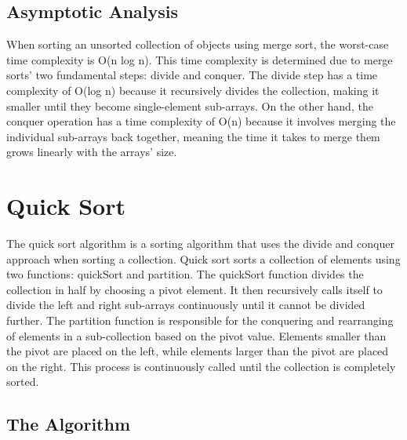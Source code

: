\documentclass[letterpaper, 10pt,DIV=13]{scrartcl}
\numberwithin{equation}{section} %
\numberwithin{figure}{section} %
\numberwithin{table}{section} %
\begin{document}
\subsection{Asymptotic Analysis}
When sorting an unsorted collection of objects using merge sort, the worst-case time complexity is O(n log n). This time complexity is determined due to merge sorts' two fundamental steps: divide and conquer. The divide step has a time complexity of O(log n) because it recursively divides the collection, making it smaller until they become single-element sub-arrays. On the other hand, the conquer operation has a time complexity of O(n) because it involves merging the individual sub-arrays back together, meaning the time it takes to merge them grows linearly with the arrays' size.


\pagebreak

\section{Quick Sort}
The quick sort algorithm is a sorting algorithm that uses the divide and conquer approach when sorting a collection. Quick sort sorts a collection of elements using two functions: quickSort and partition. The quickSort function divides the collection in half by choosing a pivot element. It then recursively calls itself to divide the left and right sub-arrays continuously until it cannot be divided further. The partition function is responsible for the conquering and rearranging of elements in a sub-collection based on the pivot value. Elements smaller than the pivot are placed on the left, while elements larger than the pivot are placed on the right. This process is continuously called until the collection is completely sorted.

\subsection{The Algorithm}
\end{document}
